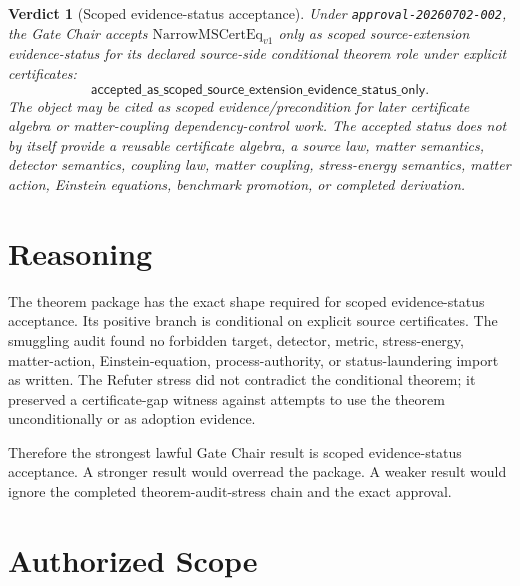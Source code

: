 \documentclass[11pt]{article}
\newcommand{\NarrowMSCertEq}{\mathrm{NarrowMSCertEq}_{v1}}
\newcommand{\GateVerdict}{\mathsf{accepted\_as\_scoped\_source\_extension\_evidence\_status\_only}}
\newtheorem{verdict}{Verdict}
\begin{document}
\begin{verdict}[Scoped evidence-status acceptance]
Under \texttt{approval-20260702-002}, the Gate Chair accepts
\(\NarrowMSCertEq\) only as scoped source-extension evidence-status for its
declared source-side conditional theorem role under explicit certificates:
\[
  \GateVerdict.
\]
The object may be cited as scoped evidence/precondition for later certificate
algebra or matter-coupling dependency-control work. The accepted status does
not by itself provide a reusable certificate algebra, a source law, matter
semantics, detector semantics, coupling law, matter coupling, stress-energy
semantics, matter action, Einstein equations, benchmark promotion, or
completed derivation.
\end{verdict}

\section{Reasoning}

The theorem package has the exact shape required for scoped evidence-status
acceptance. Its positive branch is conditional on explicit source certificates.
The smuggling audit found no forbidden target, detector, metric,
stress-energy, matter-action, Einstein-equation, process-authority, or
status-laundering import as written. The Refuter stress did not contradict the
conditional theorem; it preserved a certificate-gap witness against attempts
to use the theorem unconditionally or as adoption evidence.

Therefore the strongest lawful Gate Chair result is scoped evidence-status
acceptance. A stronger result would overread the package. A weaker result
would ignore the completed theorem-audit-stress chain and the exact approval.

\section{Authorized Scope}
\end{document}
